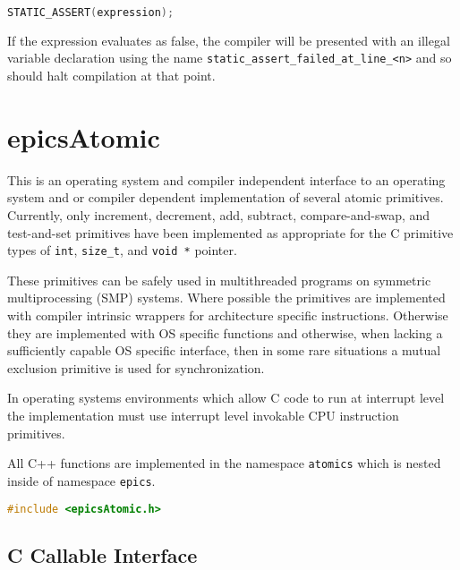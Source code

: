 \begin{lstlisting}[language=C]
STATIC_ASSERT(expression);
\end{lstlisting}

If the expression evaluates as false, the compiler will be presented with an illegal variable declaration using the name \verb|static_assert_failed_at_line_<n>| and so should halt compilation at that point.

\section{epicsAtomic}

This is an operating system and compiler independent interface to an operating system and or compiler dependent implementation of several atomic primitives.
Currently, only increment, decrement, add, subtract, compare-and-swap, and test-and-set primitives have been implemented as appropriate for the C primitive types of \verb|int|, \verb|size_t|, and \verb|void *| pointer.

These primitives can be safely used in multithreaded programs on symmetric multiprocessing (SMP) systems.
Where possible the primitives are implemented with compiler intrinsic wrappers for architecture specific instructions.
Otherwise they are implemented with OS specific functions and otherwise, when lacking a sufficiently capable OS specific interface, then in some rare situations a mutual exclusion primitive is used for synchronization.

In operating systems environments which allow C code to run at interrupt level the implementation must use interrupt level invokable CPU instruction primitives.

All C++ functions are implemented in the namespace \verb|atomics| which is nested inside of namespace \verb|epics|.

\begin{lstlisting}[language=C]
#include <epicsAtomic.h>
\end{lstlisting}

\subsection{C Callable Interface}

